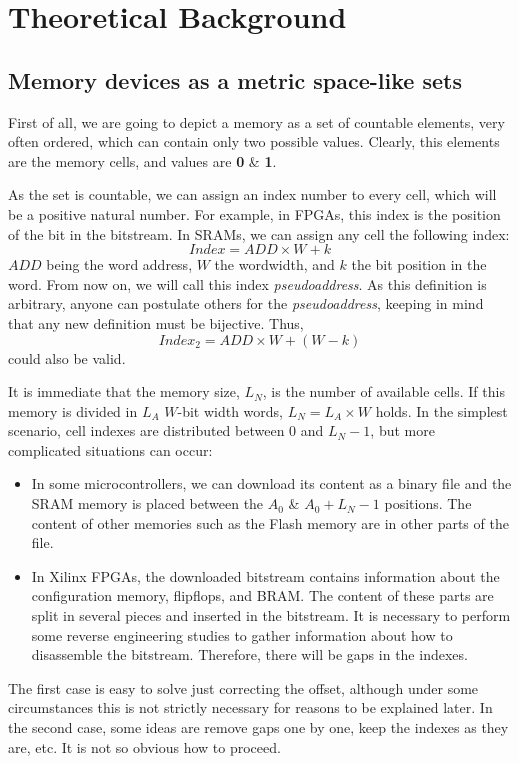 \chapter{Theoretical Background}
\section{Memory devices as a metric space-like sets}
First of all, we are going to depict a memory as a set of countable elements, very often ordered, which can contain only two possible values. Clearly, this elements are the memory cells, and values are \textbf{0} \& \textbf{1}.

As the set is countable, we can assign an index number to every cell, which will be a positive natural number. For example, in FPGAs, this index is the position of the bit in the bitstream. In SRAMs, we can assign any cell the following index:
%
\begin{equation}
	Index = ADD\times W + k
	\label{Eq:PseudoAddressDefinition}
\end{equation}
%
\(ADD\) being the word address, \(W\) the wordwidth, and \(k\) the bit position in the word. From now on, we will call this index \textit{pseudoaddress}. As this definition is arbitrary, anyone can postulate others for the \textit{pseudoaddress}, keeping in mind that any new definition  must be bijective. Thus, 
\[
	Index_2 = ADD\times W + (W-k)
\]
could also be valid.

It is immediate that the memory size, \(L_N\), is the number of available cells. If this memory is divided in \(L_A\) \(W\)-bit width words, \(L_N = L_A\times W\) holds.  In the simplest scenario, cell indexes are distributed between \(0\) and \(L_N-1\),  but more complicated situations can occur:
%
\begin{itemize}
	\item In some microcontrollers, we can download its content as a binary file and the SRAM memory is placed between the \(A_0\) \& \(A_0+L_N-1\) positions. The content of other memories such as the Flash memory are in other parts of the file.
	\item In Xilinx FPGAs, the downloaded bitstream contains information about the configuration memory, flipflops, and BRAM. The content of these parts are split in several pieces and inserted in the bitstream. It is necessary to perform some reverse engineering studies to gather information about how to disassemble the bitstream. Therefore, there will be gaps in the indexes.
\end{itemize}
%
The first case is easy to solve just correcting the offset, although under some circumstances this is not strictly necessary for reasons to be explained later. In the second case, some ideas are remove gaps one by one, keep the indexes as they are, etc. It is not so obvious how to proceed. 

